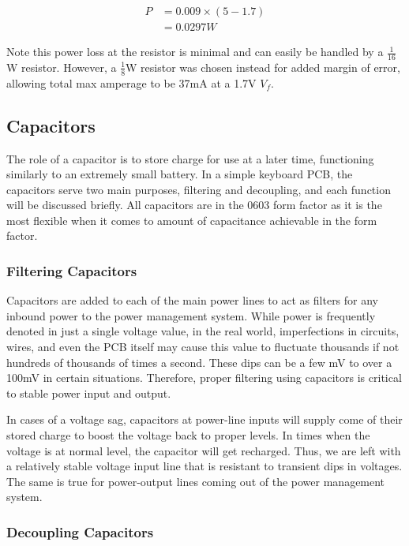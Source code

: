\documentclass[11pt]{article}
\begin{document}
\begin{equation}
\begin{aligned}
	P &= 0.009 \times (5 - 1.7)	\\
	&= 0.0297W
\end{aligned}	
\end{equation}

Note this power loss at the resistor is minimal and can easily be handled by a \(\frac{1}{16}\)W resistor. However, a \(\frac{1}{8}\)W resistor was chosen instead for added margin of error, allowing total max amperage to be 37mA at a 1.7V \(V_f\).

\subsection{Capacitors}

The role of a capacitor is to store charge for use at a later time, functioning similarly to an extremely small battery. In a simple keyboard PCB, the capacitors serve two main purposes, filtering and decoupling, and each function will be discussed briefly. All capacitors are in the 0603 form factor as it is the most flexible when it comes to amount of capacitance achievable in the form factor.

\subsubsection{Filtering Capacitors}

Capacitors are added to each of the main power lines to act as filters for any inbound power to the power management system. While power is frequently denoted in just a single voltage value, in the real world, imperfections in circuits, wires, and even the PCB itself may cause this value to fluctuate thousands if not hundreds of thousands of times a second. These dips can be a few mV to over a 100mV in certain situations. Therefore, proper filtering using capacitors is critical to stable power input and output.

In cases of a voltage sag, capacitors at power-line inputs will supply come of their stored charge to boost the voltage back to proper levels. In times when the voltage is at normal level, the capacitor will get recharged. Thus, we are left with a relatively stable voltage input line that is resistant to transient dips in voltages. The same is true for power-output lines coming out of the power management system. 

\subsubsection{Decoupling Capacitors}
\end{document}
